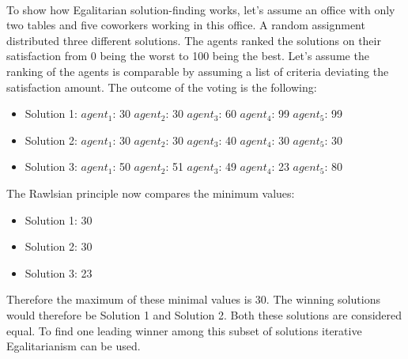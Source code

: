 \documentclass[german, a4paper, 11pt, oneside]{scrbook}
\begin{document}
\\To show how Egalitarian solution-finding works, let's assume an office with only two tables and five coworkers working in this office. A random assignment distributed three different solutions. The agents ranked the solutions on their satisfaction from 0 being the worst to 100 being the best. Let's assume the ranking of the agents is comparable by assuming a list of criteria deviating the satisfaction amount. The outcome of the voting is the following:
\begin{itemize}
\item Solution 1: $agent_1$: 30 $agent_2$: 30  $agent_3$: 60 $agent_4$: 99 $agent_5$: 99
\item Solution 2: $agent_1$: 30 $agent_2$: 30  $agent_3$: 40 $agent_4$: 30 $agent_5$: 30
\item Solution 3: $agent_1$: 50 $agent_2$: 51  $agent_3$: 49 $agent_4$: 23 $agent_5$: 80
\end{itemize}
The Rawlsian principle now compares the minimum values:
\begin{itemize}
\item Solution 1: 30 
\item Solution 2: 30 
\item Solution 3: 23
\end{itemize}
Therefore the maximum of these minimal values is 30. The winning solutions would therefore be Solution 1 and Solution 2. Both these solutions are considered equal. To find one leading winner among this subset of solutions iterative Egalitarianism can be used.
\end{document}
